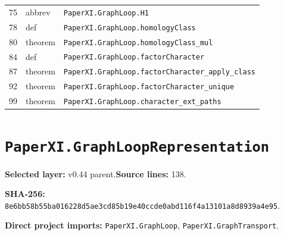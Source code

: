 \documentclass[10pt,oneside]{book}
\begin{document}
\begin{longtable}{@{}p{}p{}p{}@{}}
75&abbrev&\nolinkurl{PaperXI.GraphLoop.H1}\\

78&def&\nolinkurl{PaperXI.GraphLoop.homologyClass}\\

80&theorem&\nolinkurl{PaperXI.GraphLoop.homologyClass_mul}\\

84&def&\nolinkurl{PaperXI.GraphLoop.factorCharacter}\\

87&theorem&\nolinkurl{PaperXI.GraphLoop.factorCharacter_apply_class}\\

92&theorem&\nolinkurl{PaperXI.GraphLoop.factorCharacter_unique}\\

99&theorem&\nolinkurl{PaperXI.GraphLoop.character_ext_paths}\\

\bottomrule\end{longtable}

\section{\texorpdfstring{\nolinkurl{PaperXI.GraphLoopRepresentation}}{PaperXI.GraphLoopRepresentation}}\label{module:PaperXI.GraphLoopRepresentation}

\textbf{Selected layer:} v0.44 parent.\quad\textbf{Source lines:} 138.\par\textbf{SHA-256:} {\scriptsize\nolinkurl{8e6bb58b55ba016228d5ae3cd85b19e40ccde0abd116f4a13101a8d8939a4e95}}.


\textbf{Direct project imports:} \nolinkurl{PaperXI.GraphLoop}, \nolinkurl{PaperXI.GraphTransport}.
\end{document}
